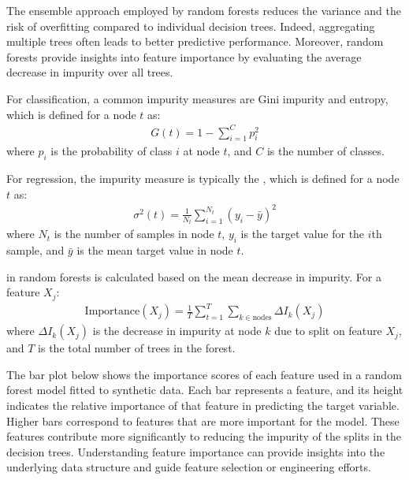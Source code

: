 \documentclass[letterpaper,10pt,english]{jupyterBook}
\begin{document}
\sphinxAtStartPar
The ensemble approach employed by random forests reduces the variance and the risk of overfitting compared to individual decision trees. Indeed, aggregating multiple trees often leads to better predictive performance. Moreover, random forests provide insights into feature importance by evaluating the average decrease in impurity over all trees.

\sphinxAtStartPar
For classification, a common impurity measures are Gini impurity and entropy, which is defined for a node \(t\) as:
\begin{equation*}
\begin{split}
  G(t) = 1 - \sum_{i=1}^{C} p_i^2
  \end{split}
\end{equation*}
\sphinxAtStartPar
where \(p_i\) is the probability of class \(i\) at node \(t\), and \(C\) is the number of classes.

\sphinxAtStartPar
For regression, the impurity measure is typically the , which is defined for a node \(t\) as:
\begin{equation*}
\begin{split}
  \sigma^2(t) = \frac{1}{N_t} \sum_{i=1}^{N_t} (y_i - \bar{y})^2
  \end{split}
\end{equation*}
\sphinxAtStartPar
where \(N_t\) is the number of samples in node \(t\), \(y_i\) is the target value for the \(i\)\sphinxhyphen{}th sample, and \(\bar{y}\) is the mean target value in node \(t\).

\sphinxAtStartPar
{} in random forests is calculated based on the mean decrease in impurity. For a feature \(X_j\):
\begin{equation*}
\begin{split}
\text{Importance}(X_j) = \frac{1}{T} \sum_{t=1}^{T} \sum_{k \in \text{nodes}} \Delta I_k(X_j)
\end{split}
\end{equation*}
\sphinxAtStartPar
where \(\Delta I_k(X_j)\) is the decrease in impurity at node \(k\) due to split on feature \(X_j\), and \(T\) is the total number of trees in the forest.

\sphinxAtStartPar
The bar plot below shows the importance scores of each feature used in a random forest model fitted to synthetic data. Each bar represents a feature, and its height indicates the relative importance of that feature in predicting the target variable. Higher bars correspond to features that are more important for the model. These features contribute more significantly to reducing the impurity of the splits in the decision trees. Understanding feature importance can provide insights into the underlying data structure and guide feature selection or engineering efforts.
\end{document}
